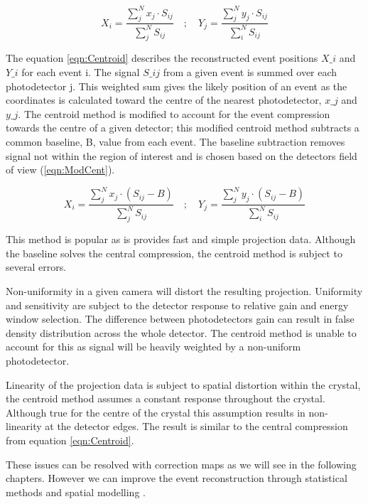 \begin{equation} \label{eqn:Centroid}
        X_{i} = \frac{\sum^{N}_{j} x_{j} \cdot S_{ij}}{\sum^{N}_{j} S_{ij}} \quad ; \quad  Y_{j} = \frac{\sum^{N}_{j} y_{j} \cdot S_{ij}}{\sum^{N}_{i} S_{ij}}
\end{equation}

The equation \ref{eqn:Centroid} describes the reconstructed event positions $X\_i$ and $Y\_i$ for each event i. The signal $S\_{ij}$ from a given event is summed over each  photodetector j. This weighted sum gives the likely position of an event as the coordinates is calculated toward the centre of the nearest photodetector, $x\_j$ and $y\_j$. The centroid method is modified to account for the event compression towards the centre of a given detector; this modified centroid method subtracts a common baseline, B, value from each event. The baseline subtraction removes signal not within the region of interest and is chosen based on the detectors field of view (\ref{eqn:ModCent}). 

\begin{equation} \label{eqn:ModCent}
        X_{i} = \frac{\sum^{N}_{j} x_{j} \cdot (S_{ij} - B)}{\sum^{N}_{j} S_{ij}} \quad ; \quad  Y_{j} = \frac{\sum^{N}_{j} y_{j} \cdot (S_{ij} - B)}{\sum^{N}_{i} S_{ij}}
\end{equation}

This method is popular as is provides fast and simple projection data. Although the baseline solves the central compression, the centroid method is subject to several errors. 

Non-uniformity in a given camera will distort the resulting projection. Uniformity and sensitivity are subject to the detector response to relative gain and energy window selection. The difference between photodetectors gain can result in false density distribution across the whole detector. The centroid method is unable to account for this as signal will be heavily weighted by a non-uniform photodetector. 

Linearity of the projection data is subject to spatial distortion within the crystal, the centroid method assumes a constant response throughout the crystal. Although true for the centre of the crystal this assumption results in non-linearity at the detector edges. The result is similar to the central compression from equation \ref{eqn:Centroid}.

These issues can be resolved with correction maps as we will see in the following chapters. However we can improve the event reconstruction through statistical methods and spatial modelling \cite{Morozov2015IterativeCamera}. 

